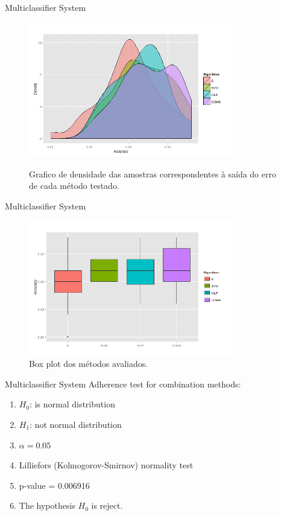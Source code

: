 \documentclass{beamer}
\begin{document}
\begin{frame}{Multiclassifier System}
\begin{figure}[h]
\centering
\includegraphics[width=3.5in]{../out/density-graph.png} \\
\caption{Grafico de densidade das amostras correspondentes à saída do erro de cada método testado.}
\label{fig:densidade_acc}
\end{figure} 
\end{frame}


\begin{frame}{Multiclassifier System}
\begin{figure}[!h]
\centering
\includegraphics[width=3.5in]{../out/boxplot-errors.png}
\caption{Box plot dos métodos avaliados.}
\label{fig:boxplot_acc}
\end{figure} 
\end{frame}


\begin{frame}{Multiclassifier System}
Adherence test for combination methods: 
\begin{enumerate}
\item $H_0$: is normal distribution
\item $H_1$: not normal distribution
\item $\alpha = 0.05$
\item Lilliefors (Kolmogorov-Smirnov) normality test
\item p-value = 0.006916
\item The hypothesis $H_0$ is reject.
\end{enumerate}
\end{frame}
\end{document}
